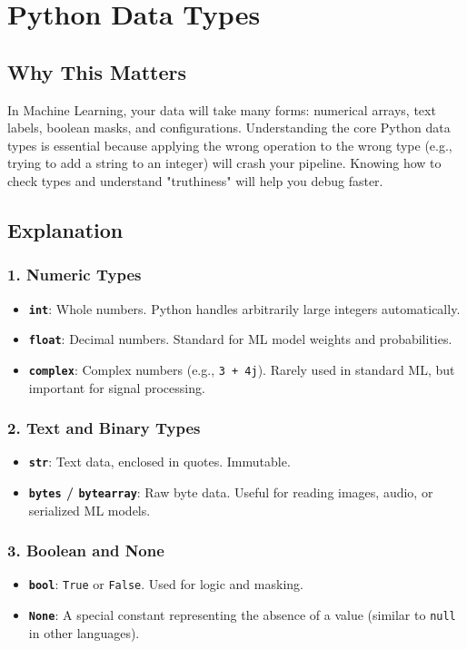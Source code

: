 \chapter{Python Data Types}

\section{Why This Matters}
In Machine Learning, your data will take many forms: numerical arrays, text labels, boolean masks, and configurations. Understanding the core Python data types is essential because applying the wrong operation to the wrong type (e.g., trying to add a string to an integer) will crash your pipeline. Knowing how to check types and understand "truthiness" will help you debug faster.

\section{Explanation}

\subsection{1. Numeric Types}
\begin{itemize}
    \item \textbf{\texttt{int}}: Whole numbers. Python handles arbitrarily large integers automatically.
    \item \textbf{\texttt{float}}: Decimal numbers. Standard for ML model weights and probabilities.
    \item \textbf{\texttt{complex}}: Complex numbers (e.g., \texttt{3 + 4j}). Rarely used in standard ML, but important for signal processing.
\end{itemize}

\subsection{2. Text and Binary Types}
\begin{itemize}
    \item \textbf{\texttt{str}}: Text data, enclosed in quotes. Immutable.
    \item \textbf{\texttt{bytes} / \texttt{bytearray}}: Raw byte data. Useful for reading images, audio, or serialized ML models.
\end{itemize}

\subsection{3. Boolean and None}
\begin{itemize}
    \item \textbf{\texttt{bool}}: \texttt{True} or \texttt{False}. Used for logic and masking.
    \item \textbf{\texttt{None}}: A special constant representing the absence of a value (similar to \texttt{null} in other languages).
\end{itemize}

